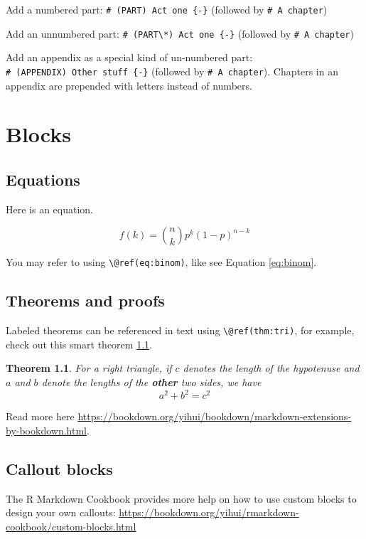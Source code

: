 \documentclass[
]{book}
\newtheorem{theorem}{Theorem}[chapter]
\theoremstyle{definition}
\theoremstyle{definition}
\theoremstyle{definition}
\theoremstyle{definition}
\theoremstyle{remark}
\begin{document}
Add a numbered part: \texttt{\#\ (PART)\ Act\ one\ \{-\}} (followed by \texttt{\#\ A\ chapter})

Add an unnumbered part: \texttt{\#\ (PART\textbackslash{}*)\ Act\ one\ \{-\}} (followed by \texttt{\#\ A\ chapter})

Add an appendix as a special kind of un-numbered part: \texttt{\#\ (APPENDIX)\ Other\ stuff\ \{-\}} (followed by \texttt{\#\ A\ chapter}). Chapters in an appendix are prepended with letters instead of numbers.

\hypertarget{blocks}{%
\chapter{Blocks}\label{blocks}}

\hypertarget{equations}{%
\section{Equations}\label{equations}}

Here is an equation.

\begin{equation} 
  f\left(k\right) = \binom{n}{k} p^k\left(1-p\right)^{n-k}
  \label{eq:binom}
\end{equation}

You may refer to using \texttt{\textbackslash{}@ref(eq:binom)}, like see Equation \eqref{eq:binom}.

\hypertarget{theorems-and-proofs}{%
\section{Theorems and proofs}\label{theorems-and-proofs}}

Labeled theorems can be referenced in text using \texttt{\textbackslash{}@ref(thm:tri)}, for example, check out this smart theorem \ref{thm:tri}.

\begin{theorem}
\protect\hypertarget{thm:tri}{}\label{thm:tri}For a right triangle, if \(c\) denotes the \emph{length} of the hypotenuse
and \(a\) and \(b\) denote the lengths of the \textbf{other} two sides, we have
\[a^2 + b^2 = c^2\]
\end{theorem}

Read more here \url{https://bookdown.org/yihui/bookdown/markdown-extensions-by-bookdown.html}.

\hypertarget{callout-blocks}{%
\section{Callout blocks}\label{callout-blocks}}

The R Markdown Cookbook provides more help on how to use custom blocks to design your own callouts: \url{https://bookdown.org/yihui/rmarkdown-cookbook/custom-blocks.html}

  
\end{document}
